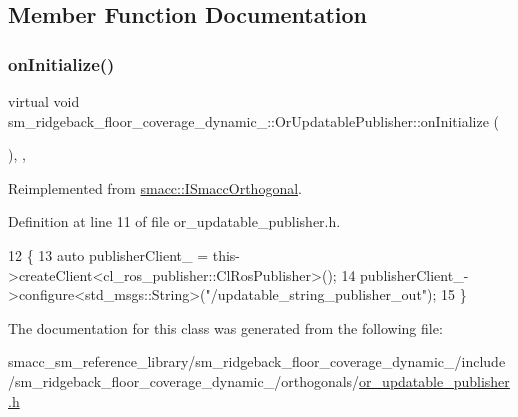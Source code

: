 \subsection{Member Function Documentation}
\mbox{\label{classsm__ridgeback__floor__coverage__dynamic__1_1_1OrUpdatablePublisher_a4d7f3d49e6075c036021b958ced9895d}} 
\subsubsection{\texorpdfstring{on\+Initialize()}{onInitialize()}}
{\footnotesize\ttfamily virtual void sm\+\_\+ridgeback\+\_\+floor\+\_\+coverage\+\_\+dynamic\+\_\+::\+Or\+Updatable\+Publisher\+::on\+Initialize (\begin{DoxyParamCaption}{ }\end{DoxyParamCaption})\hspace{0.3cm}{\ttfamily [inline]}, {\ttfamily [override]}, {\ttfamily [virtual]}}



Reimplemented from \hyperlink{classsmacc_1_1ISmaccOrthogonal_a6bb31c620cb64dd7b8417f8705c79c7a}{smacc\+::\+I\+Smacc\+Orthogonal}.



Definition at line 11 of file or\+\_\+updatable\+\_\+publisher.\+h.


\begin{DoxyCode}
12     \{
13         \textcolor{keyword}{auto} publisherClient\_ = this->createClient<cl\_ros\_publisher::ClRosPublisher>();
14         publisherClient\_->configure<std\_msgs::String>(\textcolor{stringliteral}{"/updatable\_string\_publisher\_out"});
15     \}
\end{DoxyCode}


The documentation for this class was generated from the following file\+:\begin{DoxyCompactItemize}
\item 
smacc\+\_\+sm\+\_\+reference\+\_\+library/sm\+\_\+ridgeback\+\_\+floor\+\_\+coverage\+\_\+dynamic\+\_/include/sm\+\_\+ridgeback\+\_\+floor\+\_\+coverage\+\_\+dynamic\+\_/orthogonals/\hyperlink{sm__ridgeback__floor__coverage__dynamic__1_2include_2sm__ridgeback__floor__coverage__dynamic__1_442962b705c5574c55d200a44351e668}{or\+\_\+updatable\+\_\+publisher.\+h}\end{DoxyCompactItemize}
